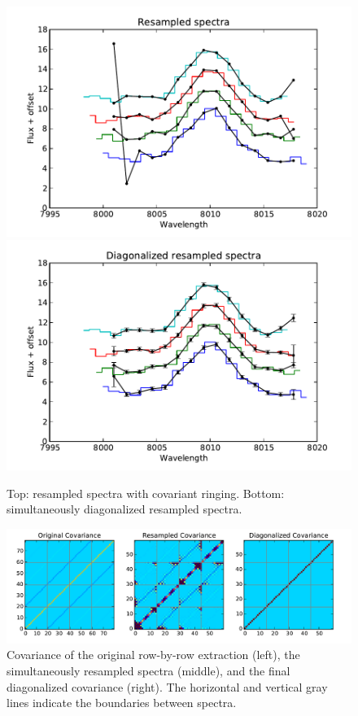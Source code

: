 \documentclass[12pt]{article}
\begin{document}
\begin{figure}[t]
\centering
\includegraphics[height=0.4\textheight]{plots/multispec_resample.pdf}
\includegraphics[height=0.4\textheight]{plots/multispec_diag.pdf}
\caption{
Top: resampled spectra with covariant ringing.
Bottom: simultaneously diagonalized resampled spectra.
}
\label{fig:multispec_resample}
\end{figure}

\begin{figure}[t]
\centering
\includegraphics[width=\textwidth]{plots/multispec_cov.pdf}
\caption{
Covariance of the original row-by-row extraction (left),
the simultaneously resampled spectra (middle),
and the final diagonalized covariance (right).
The horizontal and vertical gray lines indicate the boundaries
between spectra.
}
\label{fig:multispec_cov}
\end{figure}
\end{document}
